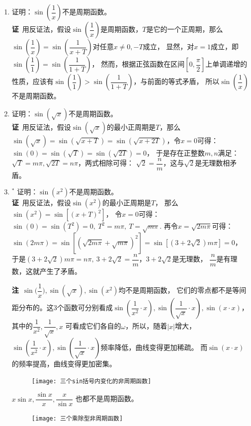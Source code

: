 \begin{enumerate}[label={【\textbf{例\thechapter.\arabic*}】},
 leftmargin=\inteval{\myenumleftmargin}pt,
 itemsep=\inteval{\myenumitempsep}pt,
 itemindent=\inteval{\myenumitemindent}pt]
\item 证明：$ \sin\left( \dfrac{1}{x}\right)  $不是周期函数。\\
\textbf{证}\ 用反证法，假设$ \sin\left( \dfrac{1}{x}\right)  $是周期函数，$ T $是它的一个正周期，那么
$ \sin\left( \dfrac{1}{x}\right)= \sin\left( \dfrac{1}{x+T}\right) $对任意$ x\neq 0,-T $成立，
显然，对$ x=1 $成立，即$ \sin\left( \dfrac{1}{1}\right)= \sin\left( \dfrac{1}{1+T}\right) $，
然而，根据正弦函数在区间$ [0,\dfrac{\pi}{2}] $上单调递增的性质，应该有$ \sin\left( \dfrac{1}{1}\right)> 
\sin\left( \dfrac{1}{1+T}\right) $，与前面的等式矛盾，
所以$ \sin\left( \dfrac{1}{x}\right)  $不是周期函数。

\item 证明：$ \sin(\sqrt{x})$不是周期函数。 \\
\textbf{证}\ 用反证法，假设$ \sin(\sqrt{x}) $的最小正周期是$ T $，那么$ \sin(\sqrt{x})=
\sin(\sqrt{x+T})=\sin(\sqrt{x+2T}) $，令$ x=0 $可得：
$ \sin(0)=\sin(\sqrt{T})=\sin(\sqrt{2T})=0 $，
于是存在正整数$ m,n $满足：$ \sqrt{T}=m\pi,\sqrt{2T}=n\pi $，两式相除可得：
$ \sqrt{2}=\dfrac{n}{m} $，这与$ \sqrt{2} $是无理数相矛盾。

\item $ ^* $ 证明：$ \sin(x^2) $不是周期函数。\\
\textbf{证}\ 用反证法，假设$ \sin(x^2) $的最小正周期是$ T $，
那么$ \sin(x^2)=\sin\left[(x+T)^2\right] $，
令$ x=0 $可得：$ \sin(0)=\sin(T^2)=0,\ T^2=m\pi,\ T=\sqrt{m\pi} $. 
再令$ x=\sqrt{2m\pi} $可得：$ \sin(2m\pi)=\sin\left[(
\sqrt{2m\pi}+\sqrt{m\pi})^2\right]=\sin\left[(3+2\sqrt{2})m\pi\right]=0 $，
于是$ (3+2\sqrt{2})m\pi=n\pi,\ 3+2\sqrt{2}=\dfrac{n}{m} $，$ 3+2\sqrt{2} $是无理数，
$ \dfrac{n}{m} $是有理数，这就产生了矛盾。

\textbf{注}\  $ \sin\Big(\dfrac{1}{x}\Big),\sin(\sqrt{x}),\sin(x^2)$均不是周期函数，
它们的零点都不是等间距分布的。这3个函数可分别看成$\sin\left(\dfrac{1}{x^2}
\cdot x\right),\sin\left(\dfrac{1}{\sqrt{x}}\cdot x\right), 
\sin\left(x\cdot x\right)$，其中的$ \dfrac{1}{x^2},\dfrac{1}{\sqrt{x}},x $
可看成它们各自的$ \omega $，所以，随着$ |x| $增大，
$\sin\left(\dfrac{1}{x^2} \cdot x\right), 
\sin\left(\dfrac{1}{\sqrt{x}}\cdot x\right)$频率降低，曲线变得更加稀疏。
而$ \sin(x\cdot x) $的频率提高，曲线变得更加密集。
\begin{figure}[h] %
    \centering
    \texttt{[image: 三个sin括号内变化的非周期函数]}
\end{figure} 

 $ x\sin x,\dfrac{\sin x}{x},\dfrac{x}{\sin x} $
 也都不是周期函数。 \\
\begin{figure}[h] %
    \centering
    \texttt{[image: 三个乘除型非周期函数]}
\end{figure}


\end{enumerate}
